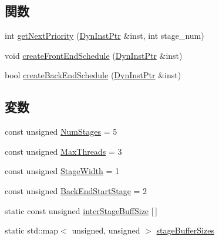 \subsection*{関数}
\begin{DoxyCompactItemize}
\item 
int \hyperlink{namespaceThePipeline_ac700a8f16a36e0276ea60791d35dbcc2}{getNextPriority} (\hyperlink{classRefCountingPtr}{DynInstPtr} \&inst, int stage\_\-num)
\item 
void \hyperlink{namespaceThePipeline_a47c8cbd46bfdf2ebcec1d556e7bcea01}{createFrontEndSchedule} (\hyperlink{classRefCountingPtr}{DynInstPtr} \&inst)
\item 
bool \hyperlink{namespaceThePipeline_abea63cbb0df7d307fa9c239e6fea49e5}{createBackEndSchedule} (\hyperlink{classRefCountingPtr}{DynInstPtr} \&inst)
\end{DoxyCompactItemize}
\subsection*{変数}
\begin{DoxyCompactItemize}
\item 
const unsigned \hyperlink{namespaceThePipeline_a6918d1731267e5f56969bfb5c240be85}{NumStages} = 5
\item 
const unsigned \hyperlink{namespaceThePipeline_ac9c0bbe9cf27d93e08ea8ccc4096e633}{MaxThreads} = 3
\item 
const unsigned \hyperlink{namespaceThePipeline_ac500730655884fbbec8f152f90582a35}{StageWidth} = 1
\item 
const unsigned \hyperlink{namespaceThePipeline_a1508fbbf00b857ada3c63696ded87cf6}{BackEndStartStage} = 2
\item 
static const unsigned \hyperlink{namespaceThePipeline_a6e9cdd6ec8350737ec1ab5eb73cbe895}{interStageBuffSize} \mbox{[}$\,$\mbox{]}
\item 
static std::map$<$ unsigned, unsigned $>$ \hyperlink{namespaceThePipeline_a051ec84638cf1b284185a59bae1a5338}{stageBufferSizes}
\end{DoxyCompactItemize}


